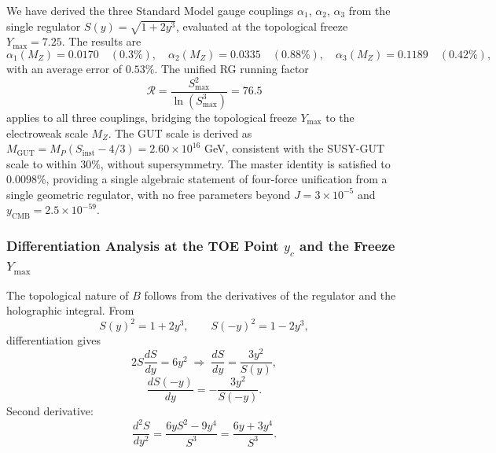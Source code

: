 \documentclass[a4paper,1pt,oneside,openany]{book}
\begin{document}
We have derived the three Standard Model gauge couplings $\alpha_1$, $\alpha_2$, $\alpha_3$ from the single regulator $S(y) = \sqrt{1 + 2y^3}$, evaluated at the topological freeze $Y_{\max} = 7.25$. The results are
\begin{equation}
\alpha_1(M_Z) = 0.0170 \quad (0.3\%), \quad \alpha_2(M_Z) = 0.0335 \quad (0.88\%), \quad \alpha_3(M_Z) = 0.1189 \quad (0.42\%),
\label{eq:final-gut}
\end{equation}
with an average error of $0.53\%$. The unified RG running factor
\begin{equation}
\mathcal{R} = \frac{S_{\max}^2}{\ln(S_{\max}^3)} = 76.5
\label{eq:final-R}
\end{equation}
applies to all three couplings, bridging the topological freeze $Y_{\max}$ to the electroweak scale $M_Z$. The GUT scale is derived as $M_{\mathrm{GUT}} = M_P(S_{\mathrm{inst}} - 4/3) = 2.60 \times 10^{16}$ GeV, consistent with the SUSY-GUT scale to within $30\%$, without supersymmetry. The master identity is satisfied to $0.0098\%$, providing a single algebraic statement of four-force unification from a single geometric regulator, with no free parameters beyond $J = 3 \times 10^{-5}$ and $y_{\mathrm{CMB}} = 2.5 \times 10^{-59}$.
\subsubsection{Differentiation Analysis at the TOE Point $y_c$ and the Freeze $Y_{\max}$}
\label{sec:differentiation-toe}

The topological nature of $B$ follows from the derivatives of the
regulator and the holographic integral. From
\begin{equation}
S(y)^2 = 1+2y^3,\qquad S(-y)^2 = 1-2y^3,
\end{equation}
differentiation gives
\begin{equation}
2S\frac{dS}{dy}=6y^2 \;\Longrightarrow\;
\boxed{\frac{dS}{dy}= \frac{3y^2}{S(y)}},
\label{eq:dSdy}
\end{equation}
\begin{equation}
\boxed{\frac{dS(-y)}{dy}= -\frac{3y^2}{S(-y)}}.
\label{eq:dSminusdy}
\end{equation}
Second derivative:
\begin{equation}
\frac{d^2S}{dy^2}= \frac{6yS^2-9y^4}{S^3}= \frac{6y+3y^4}{S^3}.
\label{eq:d2Sdy2}
\end{equation}
\end{document}
